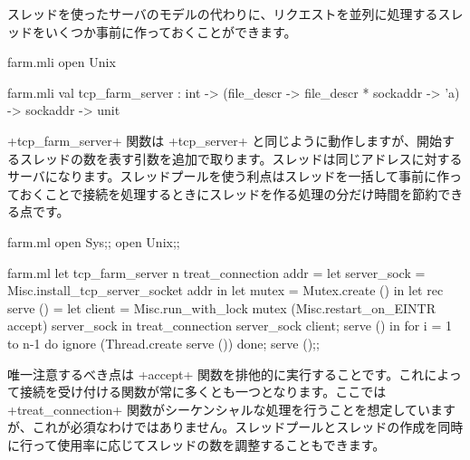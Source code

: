 \begin{example}
スレッドを使ったサーバのモデルの代わりに、リクエストを並列に処理するスレッドをいくつか事前に作っておくことができます。
%
\begin{codefile}{farm.mli}
open Unix
\end{codefile}
%
\begin{listingcodefile}{farm.mli}
val tcp_farm_server :
  int -> (file_descr -> file_descr * sockaddr -> 'a) -> sockaddr -> unit
\end{listingcodefile}
%
\ml+tcp_farm_server+ 関数は \ml+tcp_server+ と同じように動作しますが、開始するスレッドの数を表す引数を追加で取ります。スレッドは同じアドレスに対するサーバになります。スレッドプールを使う利点はスレッドを一括して事前に作っておくことで接続を処理するときにスレッドを作る処理の分だけ時間を節約できる点です。
%
\begin{codefile}{farm.ml}
open Sys;;
open Unix;;
\end{codefile}
%
\begin{listingcodefile}{farm.ml}
let tcp_farm_server n treat_connection addr =
  let server_sock = Misc.install_tcp_server_socket addr in
  let mutex = Mutex.create () in
  let rec serve () =
    let client =
      Misc.run_with_lock mutex
        (Misc.restart_on_EINTR accept) server_sock in
    treat_connection server_sock client;
    serve () in
  for i = 1 to n-1 do ignore (Thread.create serve ()) done;
  serve ();;
\end{listingcodefile}
唯一注意するべき点は \ml+accept+ 関数を排他的に実行することです。これによって接続を受け付ける関数が常に多くとも一つとなります。ここでは \ml+treat_connection+ 関数がシーケンシャルな処理を行うことを想定していますが、これが必須なわけではありません。スレッドプールとスレッドの作成を同時に行って使用率に応じてスレッドの数を調整することもできます。
\end{example}

